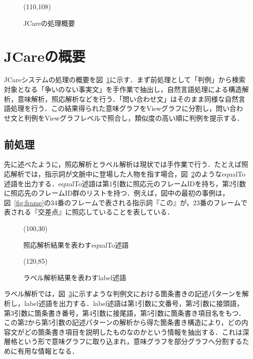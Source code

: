 \begin{figure}
\begin{center}
 \atari(110,108)
 \caption{JCareの処理概要}
 \label{fig:jcare}
\end{center}
\end{figure}

\section{JCareの概要}
JCareシステムの処理の概要を図~\ref{fig:jcare}に示す．まず前処理として「判例」から検索対象となる「争いのない事実文」を手作業で抽出し，自然言語処理による構造解析，意味解析，照応解析などを行う．「問い合わせ文」はそのまま同様な自然言語処理を行う．この結果得られた意味グラフをViewグラフに分割し，問い合わせ文と判例をViewグラフレベルで照合し，類似度の高い順に判例を提示する．

\subsection{前処理}
先に述べたように，照応解析とラベル解析は現状では手作業で行う．たとえば照応解析では，指示詞が文脈中に登場した人物を指す場合，図~\ref{fig:equalto}のようなequalTo述語を出力する．equalTo述語は第1引数に照応元のフレームIDを持ち，第2引数に照応先のフレームID群のリストを持つ．例えば，図中の最初の事例は，図~\ref{fig:frame}の34番のフレームで表される指示詞『この』が，23番のフレームで表される『交差点』に照応していることを表している．

\begin{figure}
\begin{center}
 \atari(100,30)
 \caption{照応解析結果を表わすequalTo述語}
 \label{fig:equalto}
\end{center}
\end{figure}

\begin{figure}
\begin{center}
 \atari(120,85)
 \caption{ラベル解析結果を表わすlabel述語}
 \label{fig:label}
\end{center}
\end{figure}

ラベル解析では，図~\ref{fig:label}に示すような判例文における箇条書きの記述パターンを解析し，label述語を出力する．label述語は第1引数に文番号，第2引数に接頭語，第3引数に箇条書き番号，第4引数に接尾語，第5引数に箇条書き項目名をもつ．この第2から第5引数の記述パターンの解析から得た箇条書き構造により，どの内容文がどの箇条書き項目を説明したものなのかという情報を抽出する．これは深層格という形で意味グラフに取り込まれ，意味グラフを部分グラフへ分割するために有用な情報となる．

